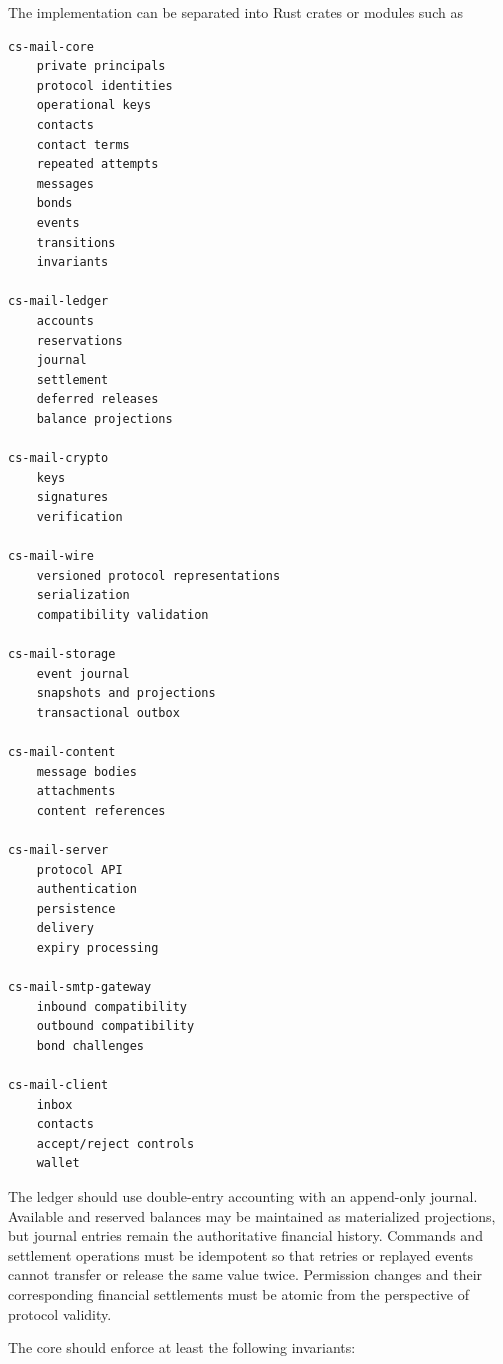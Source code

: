 \documentclass[11pt]{article}
\begin{document}
The implementation can be separated into Rust crates or modules such as

\begin{verbatim}
cs-mail-core
    private principals
    protocol identities
    operational keys
    contacts
    contact terms
    repeated attempts
    messages
    bonds
    events
    transitions
    invariants

cs-mail-ledger
    accounts
    reservations
    journal
    settlement
    deferred releases
    balance projections

cs-mail-crypto
    keys
    signatures
    verification

cs-mail-wire
    versioned protocol representations
    serialization
    compatibility validation

cs-mail-storage
    event journal
    snapshots and projections
    transactional outbox

cs-mail-content
    message bodies
    attachments
    content references

cs-mail-server
    protocol API
    authentication
    persistence
    delivery
    expiry processing

cs-mail-smtp-gateway
    inbound compatibility
    outbound compatibility
    bond challenges

cs-mail-client
    inbox
    contacts
    accept/reject controls
    wallet
\end{verbatim}

The ledger should use double-entry accounting with an append-only journal. Available and reserved balances may be maintained as materialized projections, but journal entries remain the authoritative financial history. Commands and settlement operations must be idempotent so that retries or replayed events cannot transfer or release the same value twice. Permission changes and their corresponding financial settlements must be atomic from the perspective of protocol validity.

The core should enforce at least the following invariants:
\end{document}
